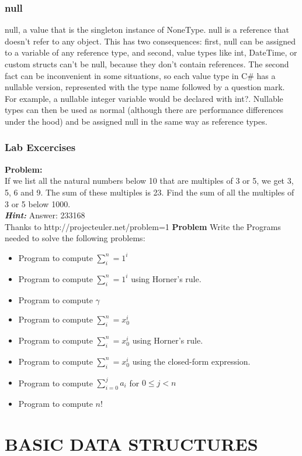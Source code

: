 \documentclass[12pt,a4paper,final,twoside,titlepage]{book}
\begin{document}
\section{null}
null, a value that is the singleton instance of NoneType. null is a reference that doesn’t refer to any object. This has two consequences: first, null can be assigned to a variable of any reference type, and second, value types like int, DateTime, or custom structs can’t be null, because they don’t contain references.
The second fact can be inconvenient in some situations, so each value type in C\# has a nullable version, represented with the type name followed by a question mark. For example, a nullable integer variable would be declared with int?. Nullable types can then be used as normal (although there are performance differences under the hood) and be assigned null in the same way as reference types.
\section{Lab Excercises}
\textbf{Problem:}\\
If we list all the natural numbers below 10 that are multiples of 3 or 5, we get 3, 5, 6 and 9. The sum of these multiples is 23.
Find the sum of all the multiples of 3 or 5 below 1000.\\
\textbf{\textit{Hint:}} Answer: 233168\\
Thanks to http://projecteuler.net/problem=1
\textbf{Problem}
Write the Programs needed to solve the following problems:
\begin{itemize}
\item Program to compute $\sum_{i}^{n}=1^{i}$
\item Program to compute $\sum_{i}^{n}=1^{i}$ using Horner's rule.
\item Program to compute $\gamma$
\item Program to compute $\sum_{i}^{n}=x_{0}^{i}$
\item Program to compute $\sum_{i}^{n}=x_{0}^{i}$ using Horner's rule.
\item Program to compute $\sum_{i}^{n}=x_{0}^{i}$ using the closed-form expression.
\item Program to compute $\sum_{i=0}^{j}a_{i}$ for $0\leq j<n$
\item Program to compute $n!$
\end{itemize}

\part{BASIC DATA STRUCTURES}
\end{document}
